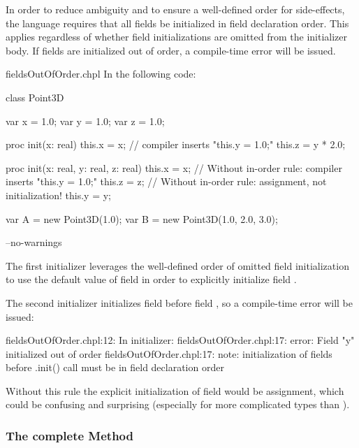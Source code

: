 In order to reduce ambiguity and to ensure a well-defined order for
side-effects, the language requires that all fields be initialized in field
declaration order. This applies regardless of whether field initializations
are omitted from the initializer body. If fields are initialized out of order,
a compile-time error will be issued.

\begin{chapelexample}{fieldsOutOfOrder.chpl}
In the following code:
\begin{chapel}
class Point3D {
  var x = 1.0;
  var y = 1.0;
  var z = 1.0;

  proc init(x: real) {
    this.x = x;
    // compiler inserts "this.y = 1.0;"
    this.z = y * 2.0;
  }

  proc init(x: real, y: real, z: real) {
    this.x = x;
    // Without in-order rule: compiler inserts "this.y = 1.0;"
    this.z = z;
    // Without in-order rule: assignment, not initialization!
    this.y = y;
  }
}

var A = new Point3D(1.0);
var B = new Point3D(1.0, 2.0, 3.0);
\end{chapel}
\begin{chapelcompopts}
--no-warnings
\end{chapelcompopts}
The first initializer leverages the well-defined order of omitted field
initialization to use the default value of field  in order to
explicitly initialize field .

The second initializer initializes field  before field , so a
compile-time error will be issued:


\begin{chapelprintoutput}
fieldsOutOfOrder.chpl:12: In initializer:
fieldsOutOfOrder.chpl:17: error: Field "y" initialized out of order
fieldsOutOfOrder.chpl:17: note: initialization of fields before .init() call must be in field declaration order
\end{chapelprintoutput}

Without this rule the explicit initialization of field  would be
assignment, which could be confusing and surprising (especially for more
complicated types than ).

\end{chapelexample}

\subsubsection{The complete Method}
\label{The_Complete_Method}

